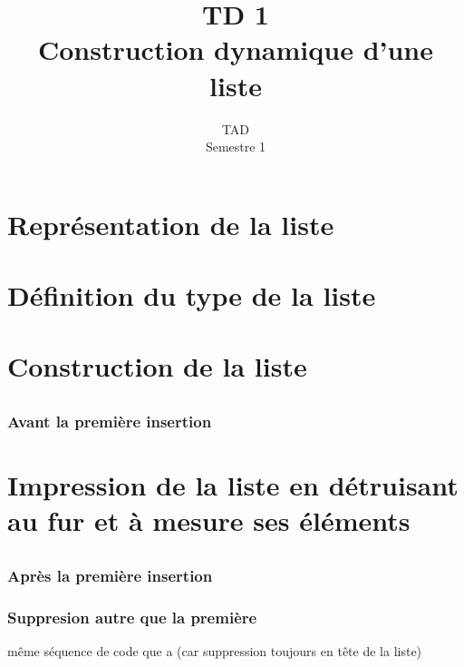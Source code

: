 \documentclass{article}
\title{TD 1\\ Construction dynamique d'une liste}
\date{TAD\\ Semestre 1}
\begin{document}
	\maketitle
	\section{Représentation de la liste}		
		
	\section{Définition du type de la liste}		
		
	\section{Construction de la liste}
		\subsection{}
		\subsection{}
			\subsubsection{Avant la première insertion}
		\subsection{}
			
	\section{Impression de la liste en détruisant au fur et à mesure 
				ses éléments}
		\subsection{}
			
		\subsection{}
			\subsubsection{Après la première insertion}
			\subsubsection{Suppresion autre que la première}
				même séquence de code que a (car suppression toujours en tête 
					de la liste)
		\subsection{}
			
\end{document}
